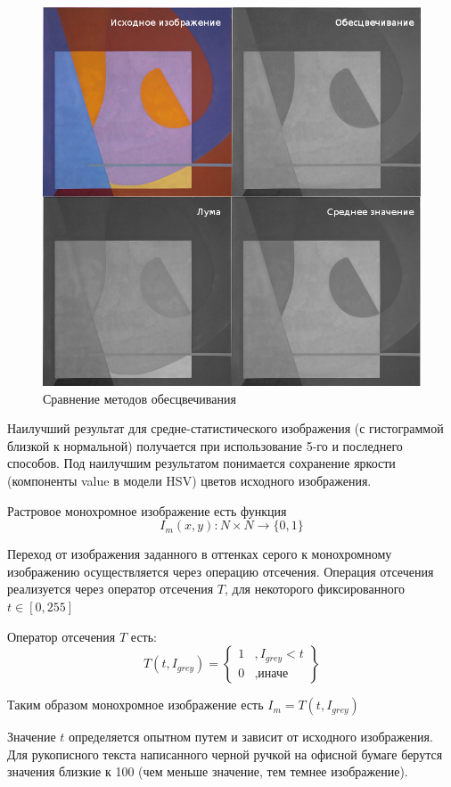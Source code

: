 \begin{figure}[h]
\centering
\includegraphics[width=0.75\linewidth,keepaspectratio]{images/th_desaturate}
\caption{Сравнение методов обесцвечивания}
\end{figure}

\begin{remark}
Наилучший результат для средне-статистического изображения (с гистограммой близкой к нормальной) получается при использование 5-го и последнего способов. Под наилучшим результатом понимается сохранение яркости (компоненты value в модели HSV) цветов исходного изображения.
\end{remark}

\begin{definition}
Растровое монохромное изображение есть функция 
$$I_m(x,y): N \times N \to \{0,1\}$$
\end{definition}

Переход от изображения заданного в оттенках серого к монохромному изображению осуществляется через операцию отсечения. Операция отсечения реализуется через оператор отсечения $T$, для некоторого фиксированного $t\in[0,255]$
\begin{definition}
Оператор отсечения $T$ есть:
$$
T(t, I_{grey}) = \left\{ 
\begin{array}{ll}
1 & ,I_{grey} < t \\
0 & ,\text{иначе} 
\end{array}
\right\}
$$
\end{definition}
Таким образом монохромное изображение есть $I_m = T(t, I_{grey})$

\begin{remark}
Значение $t$ определяется опытном путем и зависит от исходного изображения. Для рукописного текста написанного черной ручкой на офисной бумаге берутся значения близкие к 100 (чем меньше значение, тем темнее изображение).
\end{remark}

